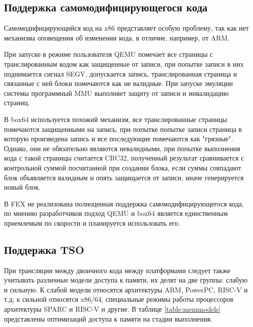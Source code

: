\newpage

\subsection{Поддержка самомодифицирующегося кода}

Самомодифицирующийся код на x86 представляет особую проблему, так как нет механизма оповещения об изменении кода, в отличие, например, от ARM.

При запуске в режиме пользователя QEMU помечает все страницы с транслированным кодом как защищенные от записи, при попытке записи в них поднимается сигнал SEGV, допускается запись, транслированная страница и связанные с ней блоки помечаются как не валидные. При запуске эмуляции системы программный MMU выполняет защиту от записи и инвалидацию страниц. \cite{qemu_docs}

В box64 используется похожий механизм, все транслированные страницы помечаются защищенными на запись, при попытке попытке записи страница в которую произведена запись и все последующие помечаются как "грязные". Однако, они не обязательно являются невалидными, при попытке выполнения кода с такой страницы считается CRC32, полученный результат сравнивается с контрольной суммой посчитанной при создании блока, если суммы совпадают блок объявляется валидным и опять защищается от записи, иначе генерируется новый блок. \cite{box64_letter}

В FEX не реализована полноценная поддержка самомодифицирующегося кода, по мнению разработчиков подход QEMU и box64 является единственным приемлемым по скорости и планируется использовать его. \cite{FEX_letter}

\subsection{Поддержка TSO}

При трансляции между двоичного кода между платформами следует также учитывать различные модели доступа к памяти, их делят на две группы: слабую и сильную. К слабой модели относятся архитектуры ARM, PowerPC, RISC-V и т.д; к сильной относятся x86/64, специальные режимы работы процессоров архитектуры SPARC и RISC-V и другие. В таблице \ref{table:memmodels} представлены оптимизаций доступа к памяти на стадии выполнения.

